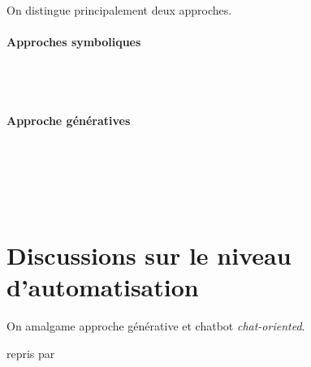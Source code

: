 	On distingue principalement deux approches.
	\cite{chen-etal:2017:survey-dialogue-systems} %

	\paragraph{Approches symboliques}
		\cite{schuurmans-frasincar:2020:intent-classification-dialogue}  \\ %
		\cite{bocklisch-etal:2017:rasa-open-source}  \\ %
		\cite{hoyt-etal:2016:ibm-watson-analytics} %

	\paragraph{Approche génératives}
		\cite{uszkoreit:2017:transformer-novel-neural}  \\ %
		\cite{ni-etal:2022:recent-advances-deep}  \\ %
		\cite{openai:2023:chatgpt}  \\ %
		\cite{touvron-etal:2023:llama-open-foundation}  \\ %
		\cite{kaddour-etal:2023:challenges-applications-large} %

\section{Discussions sur le niveau d'automatisation}
\label{annex:B.2-CHATBOT-DISCUSSION-AUTOMATISATION}
	
		
	\begin{leftBarAuthorOpinion}
		On amalgame approche générative et chatbot \textit{chat-oriented}.
	\end{leftBarAuthorOpinion}
	\cite{sheridan-verplank:1978:human-computer-control} repris par \cite{parasuraman-etal:2000:model-types-levels} \\ %

